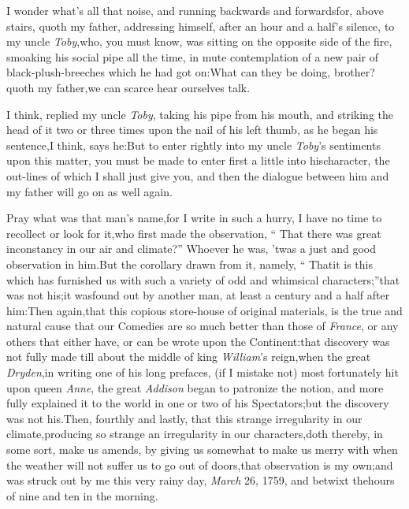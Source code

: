 \documentclass{article}
\begin{document}
\quad\tsh  I wonder what’s
all that noise, and running backwards and forwards\break for, above
stairs, quoth my father, addressing himself, after an hour and a\break
half’s silence, to my uncle \textit{Toby},\tsh  who,\pb
you must know, was sitting on the opposite side of the fire,
smoaking his social pipe all the time, in mute contemplation of a
new pair of black-plush-breeches\break
which he had got on:\tsk  What
can they be doing, brother?  quoth my father,\tsk\break  we can
scarce hear ourselves talk.

I think, replied my uncle \textit{Toby}, taking his pipe from his
mouth, and striking the head of it two or three times upon the nail
of his left thumb, as he began his sentence,\tsh  I think,
says he:\tsh\break  But to enter rightly into my uncle
\textit{Toby}’s sentiments upon this matter, you must be made
to enter first a little into his\break character, the out-lines of which
I shall just give you, and then the dialogue between
him and my father will go on as well again.

\newpage
\tsk Pray what was that man’s name,\tsk\break  for I write in such a
hurry, I have no time to recollect or look for it,\tsh  who
first made the observation, “ That there was great
inconstancy in our air and climate?” Whoever he was,
’twas a just and good observation in him.\tsk  But the
corollary drawn from it, namely, “ That\break it is this which
has furnished us with such a variety of odd and whimsical
characters;”\tsk  that was not his;\tsk  it was\break found out
by another man, at least a century and a half after him:\tsk Then\break
again,\tsk  that this copious store-house of original materials,
is the true and natural cause that our Comedies are so much better
than those of \textit{France}, or any others that either have, or can
be wrote upon the Continent:\tsh  that discovery was not
fully made till about the middle of king \textit{William}’s
reign,\tsk  when the great \textit{Dryden},\pb in writing one of his
long prefaces, (if I mistake not) most fortunately hit upon\break
{}
queen \textit{Anne}, the great \textit{Addison} began to
patronize the notion, and more fully explained it to the world in
one or two of his Spectators;\tsk  but the discovery was not
his.\tsk  Then, fourthly and lastly, that this strange
irregularity in our climate,\break producing so strange an irregularity
in our characters,\tsh  doth thereby, in some sort, make us
amends, by giving us somewhat to make us merry with when the
weather will not suffer us to go out of doors,\tsk  that
observation is my own;\tsk\break  and was struck out by me this very
rainy day, \textit{March} 26, 1759, and betwixt the\break hours of nine and
ten in the morning.
\end{document}
